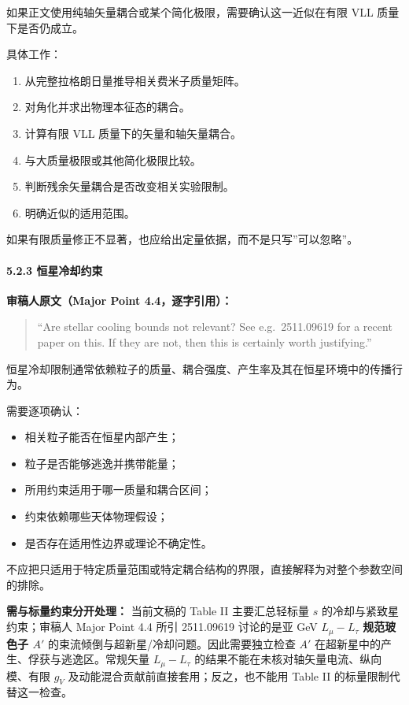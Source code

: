 \documentclass[
  chinese,
  UTF8]{ctexart}
\providecommand{\tightlist}{%
  \setlength{\itemsep}{0pt}\setlength{\parskip}{0pt}}
\begin{document}
如果正文使用纯轴矢量耦合或某个简化极限，需要确认这一近似在有限 VLL
质量下是否仍成立。

具体工作：

\begin{enumerate}
\def\labelenumi{\arabic{enumi}.}
\tightlist
\item
  从完整拉格朗日量推导相关费米子质量矩阵。
\item
  对角化并求出物理本征态的耦合。
\item
  计算有限 VLL 质量下的矢量和轴矢量耦合。
\item
  与大质量极限或其他简化极限比较。
\item
  判断残余矢量耦合是否改变相关实验限制。
\item
  明确近似的适用范围。
\end{enumerate}

如果有限质量修正不显著，也应给出定量依据，而不是只写''可以忽略''。

\paragraph{5.2.3
恒星冷却约束}\label{ux6052ux661fux51b7ux5374ux7ea6ux675f}

\textbf{审稿人原文（Major Point 4.4，逐字引用）：}

\begin{quote}
``Are stellar cooling bounds not relevant? See e.g.~2511.09619 for a
recent paper on this. If they are not, then this is certainly worth
justifying.''
\end{quote}

恒星冷却限制通常依赖粒子的质量、耦合强度、产生率及其在恒星环境中的传播行为。

需要逐项确认：

\begin{itemize}
\tightlist
\item
  相关粒子能否在恒星内部产生；
\item
  粒子是否能够逃逸并携带能量；
\item
  所用约束适用于哪一质量和耦合区间；
\item
  约束依赖哪些天体物理假设；
\item
  是否存在适用性边界或理论不确定性。
\end{itemize}

不应把只适用于特定质量范围或特定耦合结构的界限，直接解释为对整个参数空间的排除。

\textbf{需与标量约束分开处理：} 当前文稿的 Table II 主要汇总轻标量 \(s\)
的冷却与紧致星约束；审稿人 Major Point 4.4 所引 2511.09619 讨论的是亚
GeV \(L_\mu-L_\tau\) \textbf{规范玻色子 \(A'\)}
的束流倾倒与超新星/冷却问题。因此需要独立检查 \(A'\)
在超新星中的产生、俘获与逃逸区。常规矢量 \(L_\mu-L_\tau\)
的结果不能在未核对轴矢量电流、纵向模、有限 \(g_V\)
及动能混合贡献前直接套用；反之，也不能用 Table II
的标量限制代替这一检查。
\end{document}
